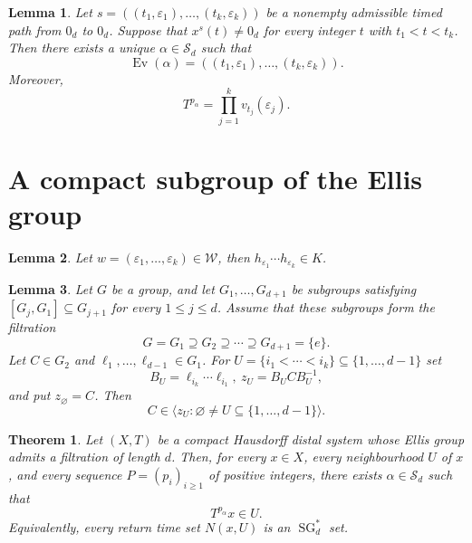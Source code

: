 \documentclass[10pt,a4paper]{amsart}
\newtheorem{theorem}{Theorem}
\newtheorem{lemma}{Lemma}
\DeclareMathOperator{\SG}{SG}
\newcommand{\Sd}{\mathcal S_d}
\newcommand{\cW}{\mathcal W}
\begin{document}
\begin{lemma}\label{lem:path-realisation}
Let $s=((t_1,\varepsilon_1),\ldots,(t_k,\varepsilon_k))$ be a nonempty admissible timed path from $0_d$ to $0_d$.  Suppose that $x^s(t)\neq0_d$ for
every integer $t$ with $t_1<t<t_k$.  Then there exists a unique
$\alpha\in\Sd$ such that
\[
  \operatorname{Ev}(\alpha)
 =((t_1,\varepsilon_1),\ldots,(t_k,\varepsilon_k)).  
\]
Moreover, 
\[
 T^{p_\alpha}=\prod_{j=1}^k v_{t_j}(\varepsilon_j).   
\]
\end{lemma}

\section{A compact subgroup of the Ellis group}\label{sec:compact-subgroup}

\begin{lemma}\label{lem:word-limit}
Let $w=(\varepsilon_1,\ldots,\varepsilon_k)\in\cW$,  
then $h_{\varepsilon_1}\cdots h_{\varepsilon_k}\in K$.
\end{lemma}

\begin{lemma}\label{lem:cap}
Let $G$ be a group, and let $G_1,\ldots,G_{d+1}$ be subgroups satisfying $[G_j,G_1]\subseteq G_{j+1}$ for every $1\leq j\leq d$.  Assume that these subgroups form the filtration
\[
 G=G_1\supseteq G_2\supseteq\cdots\supseteq G_{d+1}=\{e\}.
\]
Let $C\in G_2$ and $\ell_1,\ldots,\ell_{d-1}\in G_1$.  For
$U=\{i_1<\cdots<i_k\}\subseteq\{1,\ldots,d-1\}$ set
\[
 B_U=\ell_{i_k}\cdots\ell_{i_1},
 \ z_U=B_UCB_U^{-1},
\]
and put $z_\varnothing=C$.  Then
\[
  C\in \big\langle z_U:\varnothing\neq U\subseteq\{1,\ldots,d-1\}\big\rangle.  
\]
 
\end{lemma}

\begin{theorem}\label{thm:dynamical}
Let $(X,T)$ be a compact Hausdorff distal system whose Ellis group admits a
filtration of length $d$.  Then, for every $x\in X$, every
neighbourhood $U$ of $x$, and every sequence $P=(p_i)_{i\geq1}$ of positive
integers, there exists $\alpha\in\Sd$ such that
\[
 T^{p_\alpha}x\in U.
\]
Equivalently, every return time set $N(x,U)$ is an $\SG_d^*$ set.
\end{theorem}
\end{document}
